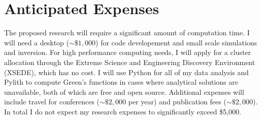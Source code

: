 \documentclass[12pt]{article}
\begin{document}
\section*{Anticipated Expenses}
The proposed research will require a significant amount of computation time.  I will need a desktop (${\sim}\$1,000$) for code developement and small scale simulations and inversion.  For high performance computing needs, I will apply for a cluster allocation through the Extreme Science and Engineering Discovery Environment (XSEDE), which has no cost.  I will use Python for all of my data analysis and Pylith \citep{Aagaard2013} to compute Green's functions in cases where analytical solutions are unavailable, both of which are free and open source.  Additional expenses will include travel for conferences (${\sim}\$2,000$ per year) and publication fees (${\sim}\$2,000$). In total I do not expect my research expenses to significantly exceed \$5,000.   



%


\end{document}
